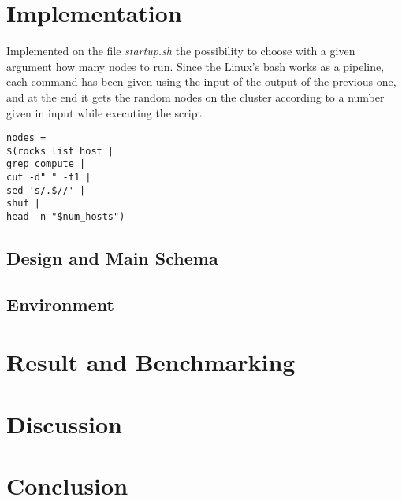 \documentclass[11pt,conference]{IEEEtran}
\begin{document}
\section{Implementation}
Implemented on the file \textit{startup.sh} the possibility to choose with a given argument how many nodes to run. Since the Linux's bash works as a pipeline, each command has been given using the input of the output of the previous one, and at the end it gets the random nodes on the cluster according to a number given in input while executing the script.
\begin{lstlisting}
nodes = 
$(rocks list host |
grep compute |
cut -d" " -f1 |
sed 's/.$//' |
shuf |
head -n "$num_hosts")
\end{lstlisting}
\subsection{Design and Main Schema}

\subsection{Environment}
\section{Result and Benchmarking}
\section{Discussion}

\section{Conclusion}



\end{document}
